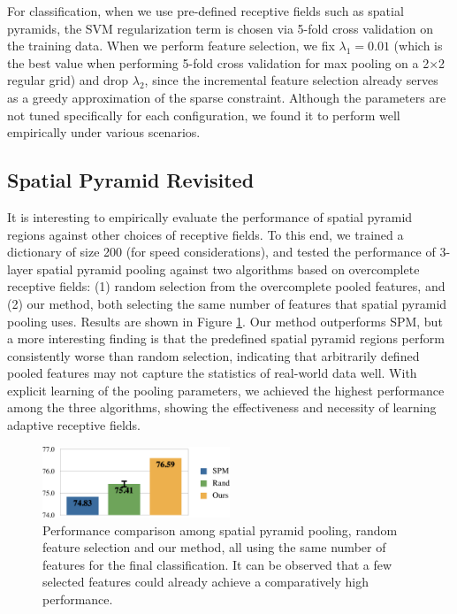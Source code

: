 For classification, when we use pre-defined receptive fields such as spatial pyramids, the SVM regularization term is chosen via 5-fold cross validation on the training data. When we perform feature selection, we fix $\lambda_1 = 0.01$ (which is the best value when performing 5-fold cross validation for max pooling on a 2$\times$2 regular grid) and drop $\lambda_2$, since the incremental feature selection already serves as a greedy approximation of the sparse constraint. Although the parameters are not tuned specifically for each configuration, we found it to perform well empirically under various scenarios.

\subsection{Spatial Pyramid Revisited}
It is interesting to empirically evaluate the performance of spatial pyramid regions against other choices of receptive fields. To this end, we trained a dictionary of size 200 (for speed considerations), and tested the performance of 3-layer spatial pyramid pooling against two algorithms based on overcomplete receptive fields: (1) random selection from the overcomplete pooled features, and (2) our method, both selecting the same number of features that spatial pyramid pooling uses. Results are shown in Figure \ref{fig:spmvsrandomvsgraft}. Our method outperforms SPM, but a more interesting finding is that the predefined spatial pyramid regions perform consistently worse than random selection, indicating that arbitrarily defined pooled features may not capture the statistics of real-world data well. With explicit learning of the pooling parameters, we achieved the highest performance among the three algorithms, showing the effectiveness and necessity of learning adaptive receptive fields.

\begin{figure}
  \centering
  \includegraphics[width=0.5\textwidth]{figs/smartpooling/perfcomparison.pdf}
  \caption{Performance comparison among spatial pyramid pooling, random feature selection and our method, all using the same number of features for the final classification. It can be observed that a few selected features could already achieve a comparatively high performance.}\label{fig:spmvsrandomvsgraft}
\end{figure}

